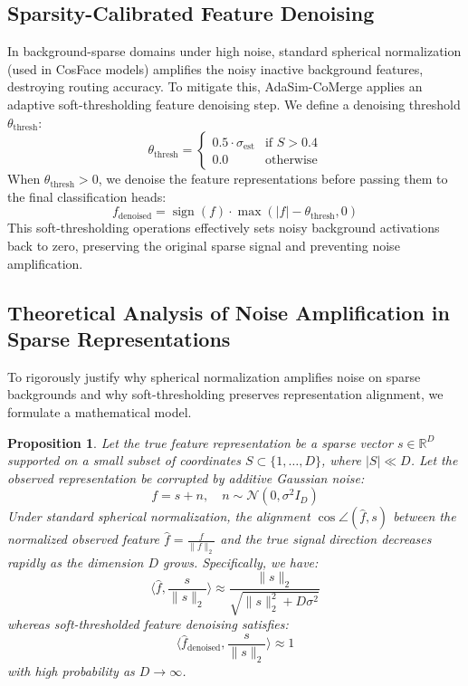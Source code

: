 \documentclass{article}
\theoremstyle{plain}
\newtheorem{proposition}[theorem]{Proposition}
\theoremstyle{definition}
\theoremstyle{remark}
\begin{document}
\subsection{Sparsity-Calibrated Feature Denoising}
In background-sparse domains under high noise, standard spherical normalization (used in CosFace models) amplifies the noisy inactive background features, destroying routing accuracy. To mitigate this, AdaSim-CoMerge applies an adaptive soft-thresholding feature denoising step. We define a denoising threshold $\theta_{\text{thresh}}$:
\begin{equation}
    \theta_{\text{thresh}} = \begin{cases} 0.5 \cdot \sigma_{\text{est}} & \text{if } S > 0.4 \\ 0.0 & \text{otherwise} \end{cases}
\end{equation}
When $\theta_{\text{thresh}} > 0$, we denoise the feature representations before passing them to the final classification heads:
\begin{equation}
    f_{\text{denoised}} = \operatorname{sign}(f) \cdot \max(|f| - \theta_{\text{thresh}}, 0)
\end{equation}
This soft-thresholding operations effectively sets noisy background activations back to zero, preserving the original sparse signal and preventing noise amplification.

\subsection{Theoretical Analysis of Noise Amplification in Sparse Representations}
\label{sec:theoretical_analysis}

To rigorously justify why spherical normalization amplifies noise on sparse backgrounds and why soft-thresholding preserves representation alignment, we formulate a mathematical model.

\begin{proposition}
Let the true feature representation be a sparse vector $s \in \mathbb{R}^D$ supported on a small subset of coordinates $S \subset \{1, \dots, D\}$, where $|S| \ll D$. Let the observed representation be corrupted by additive Gaussian noise:
\begin{equation}
    f = s + n, \quad n \sim \mathcal{N}(0, \sigma^2 I_D)
\end{equation}
Under standard spherical normalization, the alignment $\cos \angle(\hat{f}, s)$ between the normalized observed feature $\hat{f} = \frac{f}{\|f\|_2}$ and the true signal direction decreases rapidly as the dimension $D$ grows. Specifically, we have:
\begin{equation}
    \langle \hat{f}, \frac{s}{\|s\|_2} \rangle \approx \frac{\|s\|_2}{\sqrt{\|s\|_2^2 + D \sigma^2}}
\end{equation}
whereas soft-thresholded feature denoising satisfies:
\begin{equation}
    \langle \hat{f}_{\text{denoised}}, \frac{s}{\|s\|_2} \rangle \approx 1
\end{equation}
with high probability as $D \to \infty$.
\end{proposition}
\end{document}
